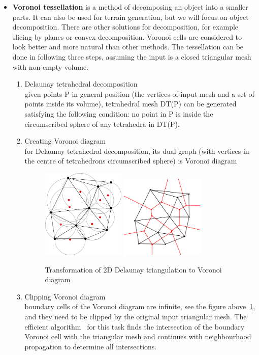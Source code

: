 \begin{itemize}
\item \textbf{Voronoi tessellation} is a method of decomposing an object into a smaller parts. It can also be used for terrain generation, but we will focus on object decomposition. There are other solutions for decomposition, for example slicing by planes or convex decomposition. Voronoi cells are considered to look better and more natural than other methods. The tessellation can be done in following three steps, assuming the input is a closed triangular mesh with non-empty volume.
\begin{enumerate}
    \item Delaunay tetrahedral decomposition \\ given points P in general position (the vertices of input mesh and a set of points inside its volume), tetrahedral mesh DT(P) can be generated satisfying the following condition: no point in P is inside the circumscribed sphere of any tetrahedra in DT(P).
    \item Creating Voronoi diagram \\ for Delaunay tetrahedral decomposition, its dual graph (with vertices in the centre of tetrahedrons circumscribed sphere) is Voronoi diagram
    \begin{figure}[ht!]
        \centering
        \includegraphics[width=0.4\textwidth]{img/delaunay}
        \includegraphics[width=0.4\textwidth]{img/voronoi}
        \caption{Transformation of 2D Delaunay triangulation to Voronoi diagram}
        \label{DT}
    \end{figure}
    \item Clipping Voronoi diagram \\ boundary cells of the Voronoi diagram are infinite, see the figure above~\ref{DT}, and they need to be clipped by the original input triangular mesh. The efficient algorithm~\cite{yan2010efficient} for this task finds the intersection of the boundary Voronoi cell with the triangular mesh and continues with neighbourhood propagation to determine all intersections. 
\end{enumerate}


\end{itemize}
